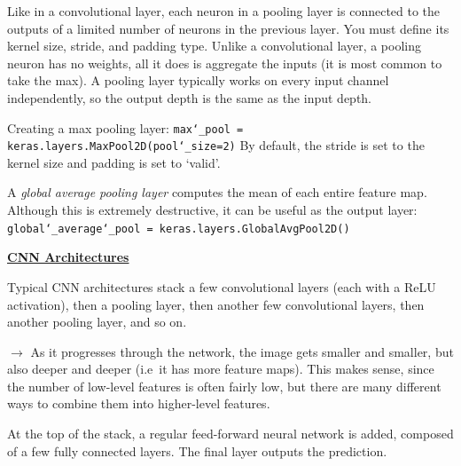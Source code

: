 Like in a convolutional layer,
each neuron in a pooling layer is connected to the outputs of a limited number of neurons in the previous layer.
You must define its kernel size, stride, and padding type.
Unlike a convolutional layer, a pooling neuron has no weights,
all it does is aggregate the inputs (it is most common to take the max).
A pooling layer typically works on every input channel independently,
so the output depth is the same as the input depth.

Creating a max pooling layer:\newline
\texttt{max\char`_pool = keras.layers.MaxPool2D(pool\char`_size=2)}\newline
By default, the stride is set to the kernel size and padding is set to `valid'.\newline

A \textit{global average pooling layer} computes the mean of each entire feature map.\newline
Although this is extremely destructive,
it can be useful as the output layer:\newline
\texttt{global\char`_average\char`_pool = keras.layers.GlobalAvgPool2D()}

\newpage
\textbf{\underline{CNN Architectures}}

Typical CNN architectures stack a few convolutional layers (each with a ReLU activation),
then a pooling layer, then another few convolutional layers, then another pooling layer, and so on.

$\rightarrow$ As it progresses through the network, the image gets smaller and smaller,
but also deeper and deeper (i.e~it has more feature maps).
This makes sense, since the number of low-level features is often fairly low,
but there are many different ways to combine them into higher-level features.

At the top of the stack,
a regular feed-forward neural network is added, composed of a few fully connected layers.
The final layer outputs the prediction.\newline

